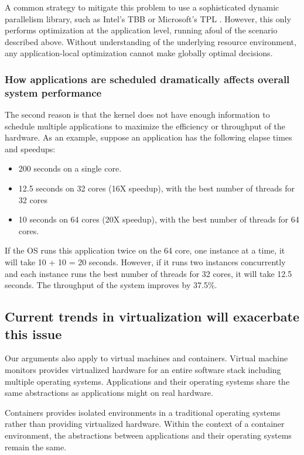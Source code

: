 
A common strategy to mitigate this problem to use a sophisticated dynamic parallelism library, such as Intel's TBB or Microsoft's TPL \cite{reinders2007intel}\cite{hellerstein2008optimizing}. However, this only performs optimization at the application level, running afoul of the scenario described above. Without understanding of the underlying resource environment, any application-local optimization cannot make globally optimal decisions.

\subsubsection{How applications are scheduled dramatically affects overall system performance}
The second reason is that the kernel does not have enough information to schedule multiple applications to maximize the efficiency or throughput of the hardware.  As an example, suppose an application has the following elapse times and speedups:
\begin{itemize}
\item
200 seconds on a single core.
\item 
12.5 seconds on 32 cores (16X speedup), with the best number of threads
for 32 cores
\item
10 seconds on 64 cores (20X speedup), with the best number of threads for 64 cores.
\end{itemize}

If the OS runs this application twice on the 64 core, one instance at a time, it will take 10 + 10 = 20 seconds.  However, if it runs two instances concurrently and each instance runs the best number of threads for 32 cores, it will take 12.5 seconds.  The throughput of the system improves by 37.5\%.

\subsection{Current trends in virtualization will exacerbate this issue}
Our arguments also apply to virtual machines and containers.  Virtual machine monitors provides virtualized hardware for an entire software stack including multiple operating systems.  Applications and their operating systems share the same abstractions as applications might on real hardware.

Containers provides isolated environments in a traditional operating systems rather than providing virtualized hardware. Within the context of a container environment, the abstractions between applications and their operating systems remain the same.

